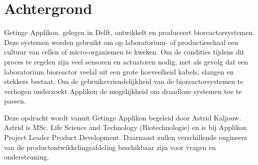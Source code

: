 \section{Achtergrond}
Getinge Applikon, gelegen in Delft, ontwikkelt en produceert bioreactorsystemen. Deze systemen worden gebruikt om op laboratorium- of productieschaal een cultuur van cellen of micro-organismen te kweken. Om de condities tijdens dit proces te regelen zijn veel sensoren en actuatoren nodig, met als gevolg dat een laboratorium bioreactor veelal uit een grote hoeveelheid kabels, slangen en stekkers bestaat. Om de gebruiksvriendelijkheid van de bioreactorsystemen te verhogen onderzoekt Applikon de mogelijkheid om draadloze systemen toe te passen. 

Deze opdracht wordt vanuit Getinge Applikon begeleid door Astrid Kaljouw. Astrid is MSc. Life Science and Technology (Biotechnologie) en is bij Applikon Project Leader Product Development. Daarnaast zullen verschillende engineers van de productontwikkelingsafdeling beschikbaar zijn voor vragen en ondersteuning. 







